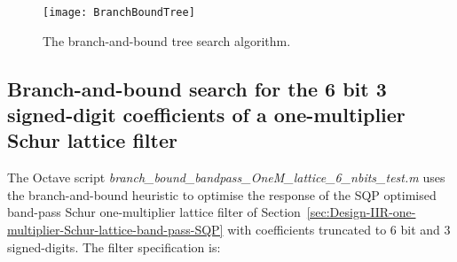 \documentclass[a4paper,twoside,10pt,english]{report}
\begin{document}
\begin{figure}[!hb]
\begin{center}
\texttt{[image: BranchBoundTree]}
\caption{The branch-and-bound tree search algorithm. }
\label{fig:branch-bound-tree-search-algorithm}
\end{center}
\end{figure}

\subsection{Branch-and-bound search for the 6 bit 3 signed-digit
coefficients of a one-multiplier Schur lattice filter}
The Octave script \emph{branch\_bound\_bandpass\_OneM\_lattice\_6\_nbits\_test.m}
uses the branch-and-bound heuristic to optimise the response of the SQP
optimised band-pass Schur one-multiplier lattice filter of
Section~\ref{sec:Design-IIR-one-multiplier-Schur-lattice-band-pass-SQP} with 
coefficients truncated to $6$ bit and $3$ signed-digits. The filter 
specification is:
\begin{small}

\end{small}
\end{document}
